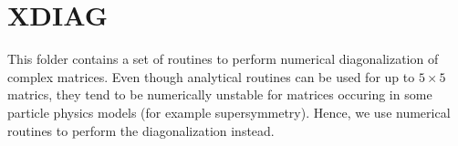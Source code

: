 \section{XDIAG}

This folder contains a set of routines to perform numerical
diagonalization of complex matrices. Even though analytical routines can be
used for up to $5 \times 5$ matrics, they tend to be numerically unstable for
matrices occuring in some particle physics models (for example supersymmetry).
Hence, we use numerical routines to perform the diagonalization instead.
